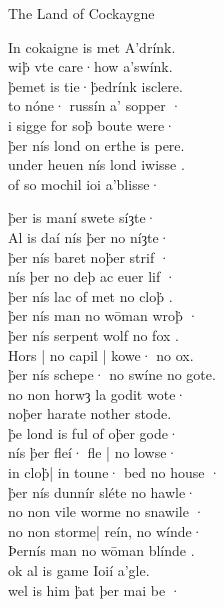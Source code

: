 \begin{texts}{The Land of Cockaygne}
\begin{textglossed}
In cokaigne is met A'drínk.\\
wi\.{þ} vte care·how a'swínk.\\
\.{þ}emet is tie·\.{þ}edrínk isclere.\\
to n\'{o}ne· russín a' sopper ·\\
i sigge for so\.{þ} boute were·\\
\.{þ}er nís lond on erthe is pere.\\
under heuen nís lond iwisse .\\
of so mochil ioi a'blisse·
  
\.{þ}er is maní swete síȝte·\\
Al is daí nís \.{þ}er no níȝte·\\
\.{þ}er nís baret no\.{þ}er strif ·\\
nís þer no deþ ac euer lif ·\\
\.{þ}er nís lac of met no clo\.{þ} .\\
\.{þ}er nís man no wōman wro\.{þ} ·\\
\.{þ}er nís serpent wolf no fox .\\
Hors | no capil | kowe· no ox.\\
\.{þ}er nís schepe· no swíne no gote.\\
no non horwȝ la godit wote·\\
no\.{þ}er harate nother stode.\\
\.{þ}e lond is ful of o\.{þ}er gode·\\
nís \.{þ}er fleí· fle | no lowse·\\
in clo\.{þ}| in toune· bed no house ·\\
\.{þ}er nís dunnír sl\'{e}te no hawle·\\
no non vile worme no snawile ·\\
no non storme| reín, no wínde·\\
Þernís man no wōman blínde .\\
ok al is game Ioií a'gle.\\
wel is him \.{þ}at þer mai be ·


\end{textglossed}
\end{texts}

